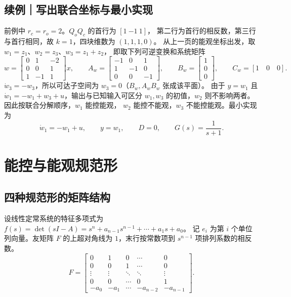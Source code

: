 \documentclass[UTF8,a4paper,12pt,fontset=fandol]{ctexart}
\begin{document}
\subsection*{续例｜写出联合坐标与最小实现}
前例中 $r_c=r_o=2$。$Q_oQ_c$ 的首行为 $[1\ {-1}\ 1]$，
第二行为首行的相反数，第三行与首行相同，故 $k=1$，四块维数为 $(1,1,1,0)$。
从上一页的能观坐标出发，取 $w_1=z_1$、$w_2=z_3$、$w_3=z_1+z_2$，
即取下列可逆变换和系统矩阵
\[
 w=\begin{bmatrix}0&1&-2\\0&0&1\\1&-1&1\end{bmatrix}x,\qquad
 A_w=\begin{bmatrix}-1&0&1\\1&-1&0\\0&0&-1\end{bmatrix},
 \qquad B_w=\begin{bmatrix}1\\0\\0\end{bmatrix},
 \qquad C_w=[1\quad0\quad0].
\]
$\dot w_3=-w_3$，所以可达子空间为 $w_3=0$（$B_w,A_wB_w$ 张成该平面）。
由于 $y=w_1$ 且 $\dot w_1=-w_1+w_3+u$，输出与已知输入可区分 $w_1,w_3$
的初值，$w_2$ 则不影响两者。因此按联合分解顺序，$w_1$ 能控能观，
$w_2$ 能控不能观，$w_3$ 不能控能观。最小实现为
\[
 \dot w_1=-w_1+u,\qquad y=w_1,\qquad D=0,\qquad G(s)=\frac{1}{s+1}.
\]
\newpage
\section{能控与能观规范形}\label{sec:canonical}

\subsection*{四种规范形的矩阵结构}

设线性定常系统的特征多项式为
$f(s)=\det(sI-A)=s^n+a_{n-1}s^{n-1}+\cdots+a_1s+a_0$。
记 $e_i$ 为第 $i$ 个单位列向量。友矩阵 $F$ 的上超对角线为 $1$，末行按常数项到 $s^{n-1}$ 项排列系数的相反数。
\[
  F=\begin{bmatrix}
    0&1&0&\cdots&0\\
    0&0&1&\cdots&0\\
    \vdots&\vdots&\ddots&\ddots&\vdots\\
    0&0&\cdots&0&1\\
    -a_0&-a_1&\cdots&-a_{n-2}&-a_{n-1}
  \end{bmatrix}.
\]
\end{document}
